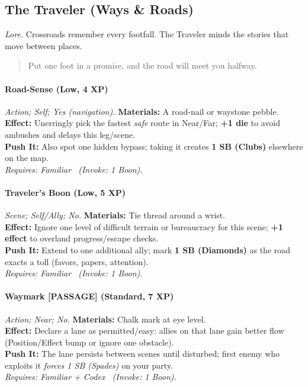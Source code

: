 \subsection{The Traveler (Ways \& Roads)}
\textit{Lore.} Crossroads remember every footfall. The Traveler minds the stories that move between places.

\begin{quote}
Put one foot in a promise, and the road will meet you halfway.
\end{quote}

\paragraph{Road-Sense (Low, 4 XP)} \emph{Action; Self; Yes (navigation).}
\textbf{Materials:} A road-nail or waystone pebble.\\
\textbf{Effect:} Unerringly pick the fastest \emph{safe} route in Near/Far; \textbf{+1 die} to avoid ambushes and delays this leg/scene.\\
\textbf{Push It:} Also spot one hidden bypass; taking it creates \textbf{1 SB (Clubs)} elsewhere on the map.\\
\emph{Requires: Familiar \ (\textit{Invoke:} 1 Boon).}

\paragraph{Traveler’s Boon (Low, 5 XP)} \emph{Scene; Self/Ally; No.}
\textbf{Materials:} Tie thread around a wrist.\\
\textbf{Effect:} Ignore one level of difficult terrain or bureaucracy for this scene; \textbf{+1 effect} to overland progress/escape checks.\\
\textbf{Push It:} Extend to one additional ally; mark \textbf{1 SB (Diamonds)} as the road exacts a toll (favors, papers, attention).\\
\emph{Requires: Familiar \ (\textit{Invoke:} 1 Boon).}

\paragraph{Waymark \textnormal{[PASSAGE]} (Standard, 7 XP)} \emph{Action; Near; No.}
\textbf{Materials:} Chalk mark at eye level.\\
\textbf{Effect:} Declare a lane as permitted/easy: allies on that lane gain better flow (Position/Effect bump or ignore one obstacle).\\
\textbf{Push It:} The lane persists between scenes until disturbed; first enemy who exploits it \emph{forces 1 SB (Spades)} on your party.\\
\emph{Requires: Familiar + Codex \ (\textit{Invoke:} 1 Boon).}

